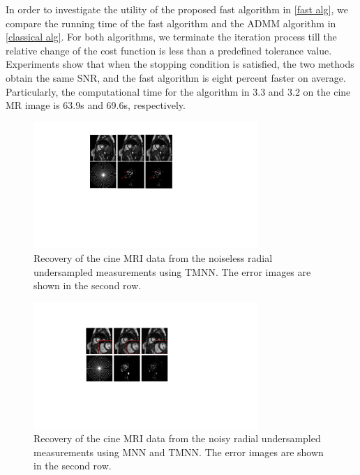 \documentclass{article}
\begin{document}
In order to investigate the utility of the proposed fast algorithm in \ref{fast alg}, we compare the running time of the fast algorithm and the ADMM algorithm in \ref{classical alg}. For both algorithms, we terminate the iteration process till the relative change of the cost function is less than a predefined tolerance value. Experiments show that when the stopping condition is satisfied, the two methods obtain the same SNR, and the fast algorithm is eight percent faster on average. Particularly, the computational time for the algorithm in 3.3 and 3.2 on the cine MR image is 63.9s and 69.6s, respectively. 


\begin{figure}[t]
\centering
{\footnotesize
{}
}
\centerline{\includegraphics[width=8.5cm]{fig1.pdf}}
\caption{Recovery of the cine MRI data from the noiseless radial undersampled measurements using TMNN. The error images are shown in the second row.}
\label{fig1}
\end{figure}

\begin{figure}[t]
\centering
{\footnotesize
{}
}
\centerline{\includegraphics[width=8.5cm]{fig2.pdf}}
\caption{Recovery of the cine MRI data from the noisy radial undersampled measurements using MNN and TMNN. The error images are shown in the second row.}
\label{fig2}
\end{figure}
\end{document}
